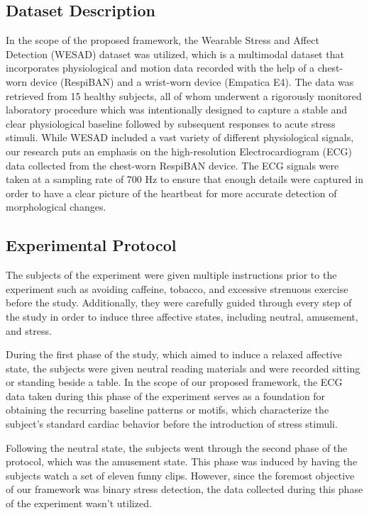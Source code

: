 \documentclass[conference,10pt]{IEEEtran}
\begin{document}
\subsection{Dataset Description}
In the scope of the proposed framework, the Wearable Stress and Affect Detection (WESAD) \cite{r3} dataset was utilized, which is a multimodal dataset that incorporates physiological and motion data recorded with the help of a chest-worn device (RespiBAN) and a wrist-worn device (Empatica E4). The data was retrieved from 15 healthy subjects, all of whom underwent a rigorously monitored laboratory procedure which was intentionally designed to capture a stable and clear physiological baseline followed by subsequent responses to acute stress stimuli.  
While WESAD included a vast variety of different physiological signals, our research puts an emphasis on the high-resolution Electrocardiogram (ECG) data collected from the chest-worn RespiBAN device. The ECG signals were taken at a sampling rate of 700 Hz to ensure that enough details were captured in order to have a clear picture of the heartbeat for more accurate detection of morphological changes.


\subsection{Experimental Protocol}

The subjects of the experiment were given multiple instructions prior to the experiment such as avoiding caffeine, tobacco, and excessive strenuous exercise before the study. Additionally, they were carefully guided through every step of the study in order to induce three affective states, including neutral, amusement, and stress.

During the first phase of the study, which aimed to induce a relaxed affective state, the subjects were given neutral reading materials and were recorded sitting or standing beside a table. In the scope of our proposed framework, the ECG data taken during this phase of the experiment serves as a foundation for obtaining the recurring baseline patterns or motifs, which characterize the subject’s standard cardiac behavior before the introduction of stress stimuli.

Following the neutral state, the subjects went through the second phase of the protocol, which was the amusement state. This phase was induced by having the subjects watch a set of eleven funny clips. However, since the foremost objective of our framework was binary stress detection, the data collected during this phase of the experiment wasn’t utilized.
\end{document}

